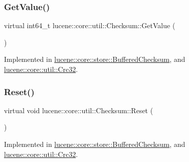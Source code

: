 \subsubsection{\texorpdfstring{Get\+Value()}{GetValue()}}
{\footnotesize\ttfamily virtual int64\+\_\+t lucene\+::core\+::util\+::\+Checksum\+::\+Get\+Value (\begin{DoxyParamCaption}{ }\end{DoxyParamCaption})\hspace{0.3cm}{\ttfamily [pure virtual]}}



Implemented in \mbox{\hyperlink{classlucene_1_1core_1_1store_1_1BufferedChecksum_a8025cb018f833b7b9596fafac869fc47}{lucene\+::core\+::store\+::\+Buffered\+Checksum}}, and \mbox{\hyperlink{classlucene_1_1core_1_1util_1_1Crc32_a57040a35d56a41c72cc5364ff07d0095}{lucene\+::core\+::util\+::\+Crc32}}.

\mbox{\label{classlucene_1_1core_1_1util_1_1Checksum_a7e2d8a05474cad9ca3d67c1e770ffa29}} 
\subsubsection{\texorpdfstring{Reset()}{Reset()}}
{\footnotesize\ttfamily virtual void lucene\+::core\+::util\+::\+Checksum\+::\+Reset (\begin{DoxyParamCaption}{ }\end{DoxyParamCaption})\hspace{0.3cm}{\ttfamily [pure virtual]}}



Implemented in \mbox{\hyperlink{classlucene_1_1core_1_1store_1_1BufferedChecksum_adc217a01c6783a02c84f7a1a013a3d92}{lucene\+::core\+::store\+::\+Buffered\+Checksum}}, and \mbox{\hyperlink{classlucene_1_1core_1_1util_1_1Crc32_a4e73914945d7e498799bd444b3fb3b2f}{lucene\+::core\+::util\+::\+Crc32}}.

\mbox{\label{classlucene_1_1core_1_1util_1_1Checksum_a7c6a70391ed64a38eb6f3db43876f652}} 
